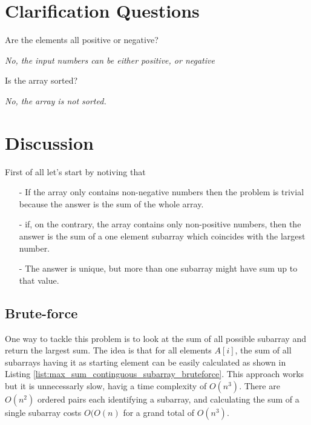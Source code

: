 \section{Clarification Questions}

\begin{QandA}
	\item Are the elements all positive or negative?
	\begin{answered}
		\textit{No, the input numbers can be either positive, or negative}
	\end{answered}
	
	\item Is the array sorted?
	\begin{answered}
		\textit{No, the array is not sorted.}
	\end{answered}
	
\end{QandA}

\section{Discussion}
\label{max_sum_continguous_subarray:sec:discussion}
First of all let's start by notiving that 
\begin{itemize}
	\item[-] If the array only contains non-negative numbers then the problem is trivial because the answer is the sum of the whole array. 
	\item[-] if, on the contrary, the array contains only non-positive numbers, then the answer is the sum of a one element subarray which coincides with the largest number.
	\item[-] The answer is unique, but more than one subarray might have sum up to that value. 
\end{itemize}

\subsection{Brute-force}
\label{sec:max_sum_continguous_subarray_bruteforce}
One way to tackle this problem is to look at the sum of all possible subarray and return the largest sum. 
The idea is that for all elements $A[i]$, the sum of all subarrays having it as starting element can be easily calculated  as shown in Listing \ref{list:max_sum_continguous_subarray_bruteforce}. This approach works but it is unnecessarly slow, havig a time complexity of $O(n^3)$. There are $O(n^2)$ ordered pairs each identifying a subarray, and calculating the sum of a single subarray costs $O(O(n)$ for a grand total of $O(n^3)$. 

